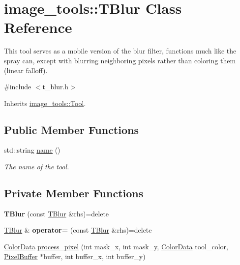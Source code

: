 \hypertarget{classimage__tools_1_1TBlur}{}\section{image\+\_\+tools\+:\+:T\+Blur Class Reference}
\label{classimage__tools_1_1TBlur}


This tool serves as a mobile version of the blur filter, functions much like the spray can, except with blurring neighboring pixels rather than coloring them (linear falloff).  




{\ttfamily \#include $<$t\+\_\+blur.\+h$>$}



Inherits \hyperlink{classimage__tools_1_1Tool}{image\+\_\+tools\+::\+Tool}.

\subsection*{Public Member Functions}
\begin{DoxyCompactItemize}
\item 
std\+::string \hyperlink{classimage__tools_1_1TBlur_a9277f8a68498ab7eb27977ae369d1c69}{name} ()
\begin{DoxyCompactList}\small\item\em The name of the tool. \end{DoxyCompactList}\end{DoxyCompactItemize}
\subsection*{Private Member Functions}
\begin{DoxyCompactItemize}
\item 
{\bfseries T\+Blur} (const \hyperlink{classimage__tools_1_1TBlur}{T\+Blur} \&rhs)=delete\hypertarget{classimage__tools_1_1TBlur_a5f9e4791a94be35cc27f3e242ce8b5db}{}\label{classimage__tools_1_1TBlur_a5f9e4791a94be35cc27f3e242ce8b5db}

\item 
\hyperlink{classimage__tools_1_1TBlur}{T\+Blur} \& {\bfseries operator=} (const \hyperlink{classimage__tools_1_1TBlur}{T\+Blur} \&rhs)=delete\hypertarget{classimage__tools_1_1TBlur_a3a6baeb4da03df232efbed9b2e2c8a03}{}\label{classimage__tools_1_1TBlur_a3a6baeb4da03df232efbed9b2e2c8a03}

\item 
\hyperlink{classimage__tools_1_1ColorData}{Color\+Data} \hyperlink{classimage__tools_1_1TBlur_ab3e88d9759fccf2ceb1c70a7c76c8dbc}{process\+\_\+pixel} (int mask\+\_\+x, int mask\+\_\+y, \hyperlink{classimage__tools_1_1ColorData}{Color\+Data} tool\+\_\+color, \hyperlink{classimage__tools_1_1PixelBuffer}{Pixel\+Buffer} $\ast$buffer, int buffer\+\_\+x, int buffer\+\_\+y)
\end{DoxyCompactItemize}
